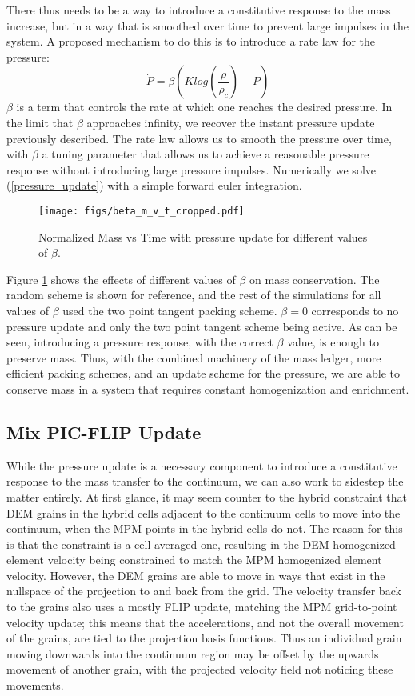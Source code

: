 There thus needs to be a way to introduce a constitutive response to the mass increase, but in a way that is smoothed over time to prevent large impulses in the system. A proposed mechanism to do this is to introduce a rate law for the pressure:
\begin{equation}
\dot P= \beta \left(Klog\left(\frac{\rho}{\rho_c}\right)-P\right)
\label{pressure_update}
\end{equation}
$\beta$ is a term that controls the rate at which one reaches the desired pressure. In the limit that $\beta$ approaches infinity, we recover the instant pressure update previously described. The rate law allows us to smooth the pressure over time, with $\beta$ a tuning parameter that allows us to achieve a reasonable pressure response without introducing large pressure impulses. Numerically we solve (\ref{pressure_update}) with a simple forward euler integration.

\begin{figure}[htp] 
    \centering
    \texttt{[image: figs/beta\_m\_v\_t\_cropped.pdf]}
    \caption{Normalized Mass vs Time with pressure update for different values of $\beta$.}
    \label{beta_m_v_t}
\end{figure}

Figure \ref{beta_m_v_t} shows the effects of different values of $\beta$ on mass conservation. The random scheme is shown for reference, and the rest of the simulations for all values of $\beta$ used the two point tangent packing scheme. $\beta=0$ corresponds to no pressure update and only the two point tangent scheme being active. As can be seen, introducing a pressure response, with the correct $\beta$ value, is enough to preserve mass. Thus, with the combined machinery of the mass ledger, more efficient packing schemes, and an update scheme for the pressure, we are able to conserve mass in a system that requires constant homogenization and enrichment.

\subsection{Mix PIC-FLIP Update}
While the pressure update is a necessary component to introduce a constitutive response to the mass transfer to the continuum, we can also work to sidestep the matter entirely. At first glance, it may seem counter to the hybrid constraint that DEM grains in the hybrid cells adjacent to the continuum cells to move into the continuum, when the MPM points in the hybrid cells do not. The reason for this is that the constraint is a cell-averaged one, resulting in the DEM homogenized element velocity being constrained to match the MPM homogenized element velocity. However, the DEM grains are able to move in ways that exist in the nullspace of the projection to and back from the grid. The velocity transfer back to the grains also uses a mostly FLIP update, matching the MPM grid-to-point velocity update; this means that the accelerations, and not the overall movement of the grains, are tied to the projection basis functions. Thus an individual grain moving downwards into the continuum region may be offset by the upwards movement of another grain, with the projected velocity field not noticing these movements. 

